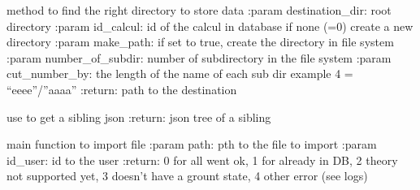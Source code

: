 \documentclass[letterpaper,10pt,english]{sphinxmanual}
\begin{document}
\begin{fulllineitems}
\label{\detokenize{QuChemPedIA.QuChemPedIA_lib:QuChemPedIA.QuChemPedIA_lib.import_file_lib.get_path_to_store}}
method to find the right directory to store data
:param destination\_dir: root directory
:param id\_calcul: id of the calcul in database if none (=0) create a new directory
:param make\_path: if set to true, create the directory in file system
:param number\_of\_subdir: number of subdirectory in the file system
:param cut\_number\_by: the length of the name of each sub dir example 4 = “eeee”/”aaaa”
:return: path to the destination

\end{fulllineitems}


\begin{fulllineitems}
\label{\detokenize{QuChemPedIA.QuChemPedIA_lib:QuChemPedIA.QuChemPedIA_lib.import_file_lib.get_siblings_json}}
use to get a sibling json
:return: json tree of a sibling

\end{fulllineitems}


\begin{fulllineitems}
\label{\detokenize{QuChemPedIA.QuChemPedIA_lib:QuChemPedIA.QuChemPedIA_lib.import_file_lib.import_file}}
main function to import file
:param path: pth to the file to import
:param id\_user: id to the user
:return: 0 for all went ok, 1 for already in DB, 2 theory not supported yet,
3 doesn’t have a grount state, 4 other error (see logs)

\end{fulllineitems}

\end{document}
